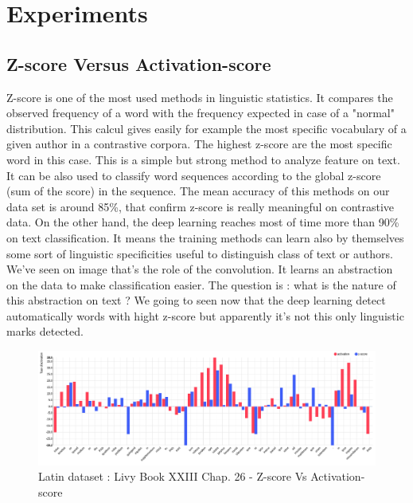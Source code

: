 \section{Experiments}

\subsection{Z-score Versus Activation-score}

Z-score is one of the most used methods in linguistic statistics. It compares the observed frequency of a word with the frequency expected in case of a "normal" distribution. This calcul gives easily for example the most specific vocabulary of a given author in a contrastive corpora. The highest z-score are the most specific word in this case. This is a simple but strong method to analyze feature on text. It can be also used to classify word sequences according to the global z-score (sum of the score) in the sequence. The mean accuracy of this methods on our data set is around 85\%, that confirm z-score is really meaningful on contrastive data. On the other hand, the deep learning reaches most of time more than 90\% on text classification. It means the training methods can learn also by themselves some sort of linguistic specificities useful to distinguish class of text or authors. We've seen on image that's the role of the convolution. It learns an abstraction on the data to make classification easier. The question is : what is the nature of this abstraction on text ? We going to seen now that the deep learning detect automatically words with hight z-score but apparently it's not this only linguistic marks detected.

\begin{figure}[h]
\begin{center}
\includegraphics[width=16cm]{img/z-score_activations.png}
\caption{Latin dataset : Livy Book XXIII Chap. 26 - Z-score Vs Activation-score}
\label{comparision}
\end{center}
\end{figure}

